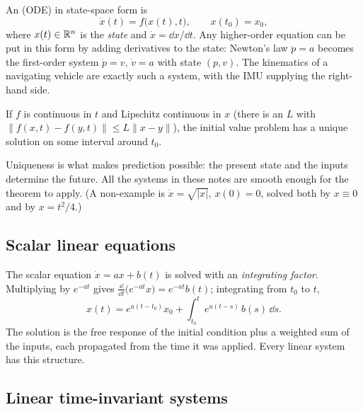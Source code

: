 An  (ODE) in state-space form is
\begin{equation}
  \dot x(t) = f\big(x(t), t\big), \qquad x(t_0) = x_0,
\end{equation}
where $x(t) \in \mathbb{R}^n$ is the \emph{state} and $\dot x = \dd x/\dd t$. Any higher-order equation can be put in this form by adding derivatives to
the state: Newton's law $\ddot p = a$ becomes the first-order system $\dot p = v$, $\dot v = a$ with state $(p, v)$. The kinematics of a
navigating vehicle are exactly such a system, with the IMU supplying the right-hand side.

\begin{theorem}
If $f$ is continuous in $t$ and Lipschitz continuous in $x$ (there is an $L$ with $\|f(x, t) - f(y, t)\| \le L\|x - y\|$), the initial value
problem has a unique solution on some interval around $t_0$.
\end{theorem}

Uniqueness is what makes prediction possible: the present state and the inputs determine the future. All the systems in these notes are
smooth enough for the theorem to apply. (A non-example is $\dot x = \sqrt{|x|}$, $x(0) = 0$, solved both by $x \equiv 0$ and by $x = t^2/4$.)

\subsection{Scalar linear equations}

The scalar equation $\dot x = ax + b(t)$ is solved with an \emph{integrating factor}. Multiplying by $e^{-at}$ gives
$\frac{\dd}{\dd t}\big(e^{-at}x\big) = e^{-at}b(t)$; integrating from $t_0$ to $t$,
\begin{equation}
  x(t) = e^{a(t - t_0)}x_0 + \int_{t_0}^t e^{a(t - s)}\,b(s)\,\dd s .
\end{equation}
The solution is the free response of the initial condition plus a weighted sum of the inputs, each propagated from the time it was applied.
Every linear system has this structure.

\subsection{Linear time-invariant systems}

